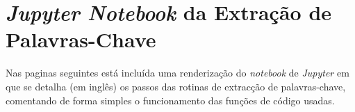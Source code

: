 \chapter{\textit{Jupyter Notebook} da Extração de Palavras-Chave}
\label{ap1}


Nas paginas seguintes está incluída uma renderização do \textit{notebook} de \textit{Jupyter} em que se detalha (em inglês) os passos das rotinas de extracção de palavras-chave, comentando de forma simples o funcionamento das funções de código usadas.

